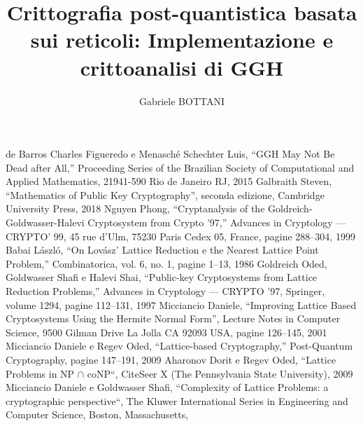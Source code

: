\documentclass[a4paper,12pt]{report}
\theoremstyle{definition}
\begin{document}
\title{Crittografia post-quantistica basata sui reticoli: Implementazione e crittoanalisi di GGH}
\author{Gabriele BOTTANI}

% 
%
\beforepreface
\afterpreface
% 
% 

%

%

%

%

%

%
%
\begin{thebibliography}{}
    de Barros Charles Figueredo e Menasché Schechter Luis, “GGH May Not Be Dead after All,” 
    Proceeding Series of the Brazilian Society of Computational and Applied Mathematics, 
    21941-590 Rio de Janeiro RJ, 2015
    Galbraith Steven, “Mathematics of Public Key Cryptography”, seconda edizione, 
    Cambridge University Press, 2018
    Nguyen Phong, “Cryptanalysis of the Goldreich-Goldwasser-Halevi Cryptosystem from 
    Crypto ’97,” Advances in Cryptology — CRYPTO’ 99, 45 rue d’Ulm, 75230 Paris Cedex 05, 
    France, pagine 288–304, 1999
    Babai László, “On Lovász’ Lattice Reduction e the Nearest Lattice Point Problem,” 
    Combinatorica, vol. 6, no. 1, pagine 1–13, 1986
    Goldreich Oded, Goldwasser Shafi e Halevi Shai,  “Public-key Cryptosystems from 
    Lattice Reduction Problems,” Advances in Cryptology — CRYPTO ’97, Springer, volume 1294, 
    pagine 112–131, 1997
    Micciancio Daniele,  “Improving Lattice Based Cryptosystems Using the Hermite 
    Normal Form”, Lecture Notes in Computer Science, 9500 Gilman Drive La Jolla 
    CA 92093 USA, pagine 126–145, 2001
    Micciancio Daniele e Regev Oded, “Lattice-based Cryptography,” Post-Quantum 
    Cryptography, pagine 147–191, 2009
    Aharonov Dorit e Regev Oded, “Lattice Problems in NP $\cap$ coNP“, 
    CiteSeer X (The Pennsylvania State University), 2009
    Micciancio Daniele e Goldwasser Shafi, 
    “Complexity of Lattice Problems: a cryptographic perspective“,
    The Kluwer International Series in Engineering and Computer Science, Boston, Massachusetts,

\end{thebibliography}
\end{document}
